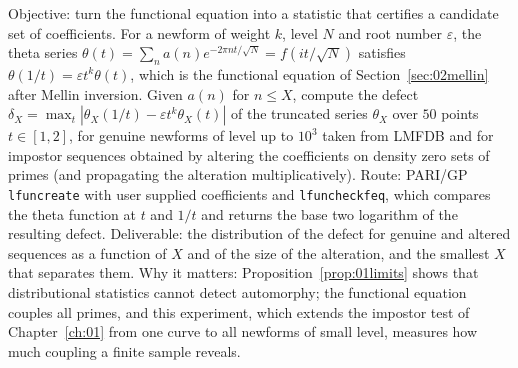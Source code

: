 \begin{compproblem}
Objective: turn the functional equation into a statistic that certifies a candidate set of coefficients. For a newform of weight $k$, level $N$ and root number $\varepsilon$, the theta series $\theta(t)=\sum_na(n)e^{-2\pi nt/\sqrt N}=f(it/\sqrt N)$ satisfies $\theta(1/t)=\varepsilon t^k\theta(t)$, which is the functional equation of Section~\ref{sec:02mellin} after Mellin inversion. Given $a(n)$ for $n\le X$, compute the defect $\delta_X=\max_t|\theta_X(1/t)-\varepsilon t^k\theta_X(t)|$ of the truncated series $\theta_X$ over $50$ points $t\in[1,2]$, for genuine newforms of level up to $10^3$ taken from LMFDB \cite{lmfdb} and for impostor sequences obtained by altering the coefficients on density zero sets of primes (and propagating the alteration multiplicatively). Route: PARI/GP \texttt{lfuncreate} with user supplied coefficients and \texttt{lfuncheckfeq}, which compares the theta function at $t$ and $1/t$ and returns the base two logarithm of the resulting defect. Deliverable: the distribution of the defect for genuine and altered sequences as a function of $X$ and of the size of the alteration, and the smallest $X$ that separates them. Why it matters: Proposition~\ref{prop:01limits} shows that distributional statistics cannot detect automorphy; the functional equation couples all primes, and this experiment, which extends the impostor test of Chapter~\ref{ch:01} from one curve to all newforms of small level, measures how much coupling a finite sample reveals.
\end{compproblem}
